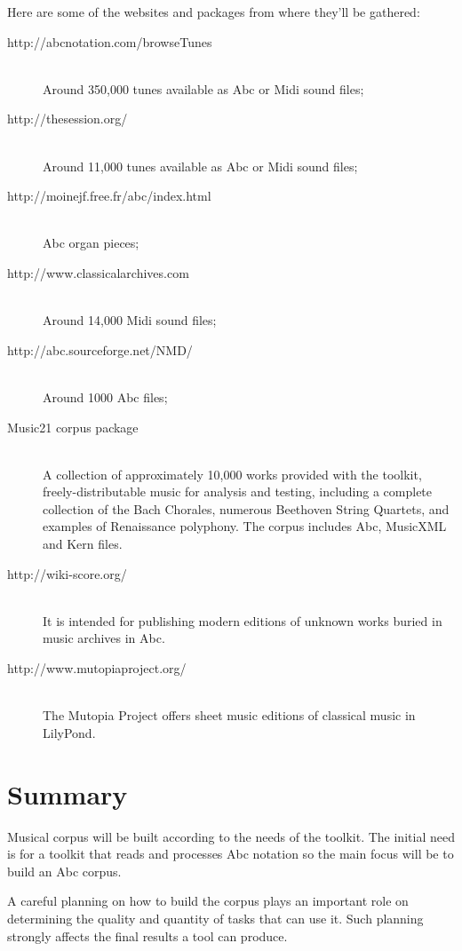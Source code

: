 \documentclass[main.tex]{files}
\begin{document}
Here are some of the websites and packages from where they'll be gathered:
\begin{description}
  \item[http://abcnotation.com/browseTunes] \hfill \\
    Around 350,000 tunes available as Abc or Midi sound files;
  \item[http://thesession.org/] \hfill \\
    Around 11,000 tunes available as Abc or Midi sound files;
  \item[http://moinejf.free.fr/abc/index.html] \hfill \\
    Abc organ pieces;
  \item[http://www.classicalarchives.com] \hfill \\
    Around 14,000 Midi sound files;
  \item[http://abc.sourceforge.net/NMD/] \hfill \\
    Around 1000 Abc files;
  \item[Music21 corpus package] \hfill \\
    A collection of approximately 10,000 works provided with the toolkit, freely-distributable music
    for analysis and testing, including a complete collection of the Bach Chorales, numerous
    Beethoven String Quartets, and examples of Renaissance polyphony. The corpus includes Abc,
    MusicXML and Kern files.
  \item[http://wiki-score.org/] \hfill \\
    It is intended for publishing modern editions of unknown works buried in music archives in Abc.
  \item[http://www.mutopiaproject.org/] \hfill \\
    The Mutopia Project offers sheet music editions of classical music in LilyPond.
\end{description}

\section{Summary}

Musical corpus will be built according to the needs of the toolkit. The initial need is for a
toolkit that reads and processes Abc notation so the main focus will be to build an Abc corpus.

A careful planning on how to build the corpus plays an important role on determining the quality and
quantity of tasks that can use it. Such planning strongly affects the final results a tool can
produce.
\end{document}
